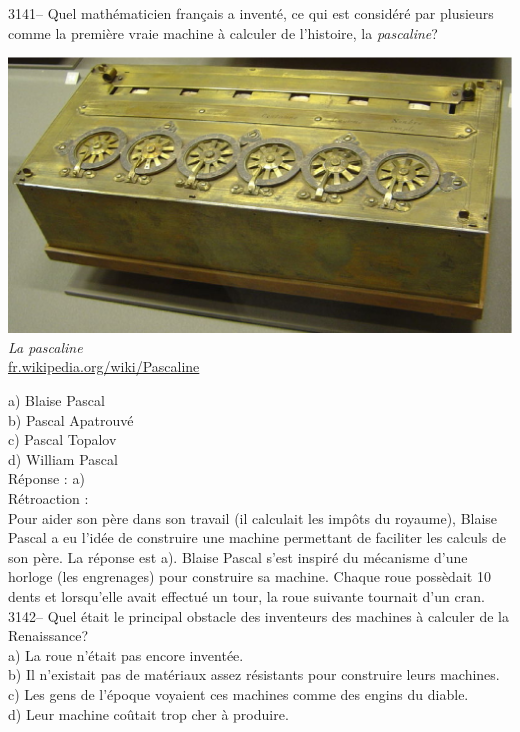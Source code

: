 \documentclass[letterpaper, 12pt]{article}
\begin{document}
3141-- Quel math\'ematicien fran\c cais a invent\'e, ce qui est consid\'er\'e par plusieurs comme la premi\`ere vraie machine \`a calculer de l'histoire, la \emph{pascaline}?
\begin{center}
\includegraphics[scale=0.15]{pascaline.eps}\\
\emph{{\small La pascaline}}\\
\href{http://fr.wikipedia.org/wiki/Pascaline}{fr.wikipedia.org/wiki/Pascaline}\\
\end{center}

a) Blaise Pascal\\
b) Pascal Apatrouv\'e\\
c) Pascal Topalov\\
d) William Pascal\\

R\'eponse : a)\\

R\'etroaction :\\
Pour aider son p\`ere dans son travail (il calculait les imp\^ots du royaume), Blaise Pascal a eu l'id\'ee de construire une machine permettant de faciliter les calculs de son p\`ere. La r\'eponse est a). Blaise Pascal s'est inspir\'e du m\'ecanisme d'une horloge (les engrenages) pour construire sa machine. Chaque roue poss\`edait 10 dents et lorsqu'elle avait effectu\'e un tour, la roue suivante tournait d'un cran.\\



3142-- Quel \'etait le principal obstacle des inventeurs des machines \`a calculer de la Renaissance?\\

a) La roue n'\'etait pas encore invent\'ee.\\
b) Il n'existait pas de mat\'eriaux assez r\'esistants pour construire leurs machines.\\
c) Les gens de l'\'epoque voyaient ces machines comme des engins du diable.\\
d) Leur machine co\^utait trop cher \`a produire.\\
\end{document}
